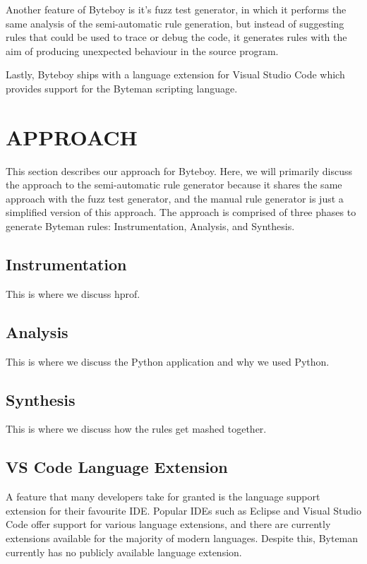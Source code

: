 \documentclass[letterpaper,twocolumn,10pt]{article}
\begin{document}
Another feature of Byteboy is it's fuzz test generator, in which it performs the same analysis of the semi-automatic rule generation, but instead of suggesting rules that could be used to trace or debug the code, it generates rules with the aim of producing unexpected behaviour in the source program.

Lastly, Byteboy ships with a language extension for Visual Studio Code which provides support for the Byteman scripting language.

\section{APPROACH}

This section describes our approach for Byteboy. Here, we will primarily discuss the approach to the semi-automatic rule generator because it shares the same approach with the fuzz test generator, and the manual rule generator is just a simplified version of this approach. The approach is comprised of three phases to generate Byteman rules: Instrumentation, Analysis, and Synthesis.

\subsection{Instrumentation}

This is where we discuss hprof.

\subsection{Analysis}

This is where we discuss the Python application and why we used Python.

\subsection{Synthesis}

This is where we discuss how the rules get mashed together.

\subsection{VS Code Language Extension}

A feature that many developers take for granted is the language support extension for their favourite IDE. Popular IDEs such as Eclipse and Visual Studio Code offer support for various language extensions, and there are currently extensions available for the majority of modern languages. Despite this, Byteman currently has no publicly available language extension. 
\end{document}
